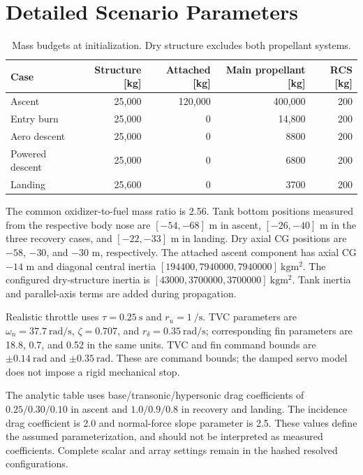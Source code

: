 \documentclass[11pt,letterpaper]{article}
\begin{document}


\section{Detailed Scenario Parameters}\label{app:parameters}
\begin{table}[!htbp]
\centering\small
\caption{Mass budgets at initialization. Dry structure excludes both propellant systems.}\label{tab:massbudget}
\begin{tabularx}{\textwidth}{Yrrrr}\toprule
Case & Structure [kg] & Attached [kg] & Main propellant [kg] & RCS [kg]\\\midrule
Ascent & 25,000 & 120,000 & 400,000 & 200\\
Entry burn & 25,000 & 0 & 14,800 & 200\\
Aero descent & 25,000 & 0 & 8800 & 200\\
Powered descent & 25,000 & 0 & 6800 & 200\\
Landing & 25,600 & 0 & 3700 & 200\\\bottomrule
\end{tabularx}
\end{table}

The common oxidizer-to-fuel mass ratio is 2.56. Tank bottom positions measured from the respective body nose are $[-54,-68]$ m in ascent, $[-26,-40]$ m in the three recovery cases, and $[-22,-33]$ m in landing. Dry axial CG positions are $-58$, $-30$, and $-30$ m, respectively. The attached ascent component has axial CG $-14$ m and diagonal central inertia $[194400,7940000,7940000]~\si{\kilogram\metre\squared}$. The configured dry-structure inertia is $[43000,3700000,3700000]~\si{\kilogram\metre\squared}$. Tank inertia and parallel-axis terms are added during propagation.

Realistic throttle uses $\tau=\SI{0.25}{\second}$ and $r_u=\SI{1}{\per\second}$. TVC parameters are $\omega_n=\SI{37.7}{\radian\per\second}$, $\zeta=0.707$, and $r_\delta=\SI{0.35}{\radian\per\second}$; corresponding fin parameters are 18.8, 0.7, and 0.52 in the same units. TVC and fin command bounds are $\pm\SI{0.14}{\radian}$ and $\pm\SI{0.35}{\radian}$. These are command bounds; the damped servo model does not impose a rigid mechanical stop.

The analytic table uses base/transonic/hypersonic drag coefficients of $0.25/0.30/0.10$ in ascent and $1.0/0.9/0.8$ in recovery and landing. The incidence drag coefficient is 2.0 and normal-force slope parameter is 2.5. These values define the assumed parameterization, and should not be interpreted as measured coefficients. Complete scalar and array settings remain in the hashed resolved configurations.
\end{document}
